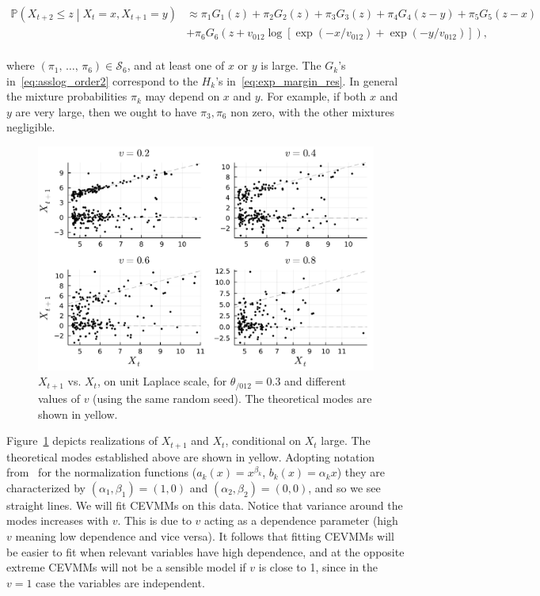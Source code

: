 \documentclass[11pt,twoside,openany]{book}
\newcommand{\prob}{\mathbb{P}}
\numberwithin{Theorem}{chapter}
\numberwithin{Definition}{chapter}
\numberwithin{Lemma}{chapter}
\numberwithin{Algorithm}{chapter}
\numberwithin{equation}{chapter}
\begin{document}
\begin{equation}\label{eq:asslog_order2}
  \begin{split}
    \prob\left(X_{t+2}\leq z\middle| X_{t} = x, X_{t+1}=y\right) &\approx
  \pi_{1} G_1 (z) + \pi_{2} G_2\left(z\right) + \pi_{3}G_3\left(z\right)
  +\pi_4 G_4(z - y)
  + \pi_5 G_5(z - x)\\
    &+ \pi_6 G_6(z + v_{012}\log[\exp(-x/v_{012})+\exp(-y/v_{012})]),\\
\end{split}
\end{equation}

where $(\pi_{1},\,\ldots,\,\pi_6)\in\mathcal{S}_6$, and at least one of $x$ or $y$
is large.
The $G_k$'s in~\eqref{eq:asslog_order2} correspond to the $H_k$'s in~\eqref{eq:exp_margin_res}.
In general the mixture probabilities $\pi_k$ may depend on $x$ and $y$.
For example, if both $x$ and $y$ are very large, then we ought to have $\pi_3,\pi_6$
non zero, with the other mixtures negligible.



\begin{figure}[htp]
  \centering
  \includegraphics[scale=0.75]{../asym-log/figures/3dim-x2-vs-x1-laplace-scale.pdf}
  \caption{$X_{t+1}$ vs. $X_{t}$, on unit Laplace scale, for
    $\theta_{/012}=0.3$ and
    different values of $v$ (using the same random
seed). The theoretical modes are shown in yellow.}\label{fig:asslogx2vsx1} \end{figure}


Figure~\ref{fig:asslogx2vsx1} depicts realizations of $X_{t+1}$ and $X_{t}$,
conditional on $X_{t}$ large. The theoretical modes established above are shown
in yellow. Adopting notation from~\cite{keef2013estimation} for the
normalization functions ($a_k(x) = x^{\beta_k}$, $b_k(x) = \alpha_k x$) they
are characterized by $(\alpha_1,\beta_1)=(1,0)$ and $(\alpha_2,\beta_2)=(0,0)$,
and so we see straight lines. We will fit CEVMMs on this data. Notice that
variance around the modes increases with $v$. This is due to $v$ acting as a
dependence parameter (high $v$ meaning low dependence and vice versa). It
follows that fitting CEVMMs will be easier to fit when relevant variables have
high dependence, and at the opposite extreme CEVMMs will not be a sensible
model if $v$ is close to 1, since in the $v=1$ case the variables are
independent.
\end{document}
